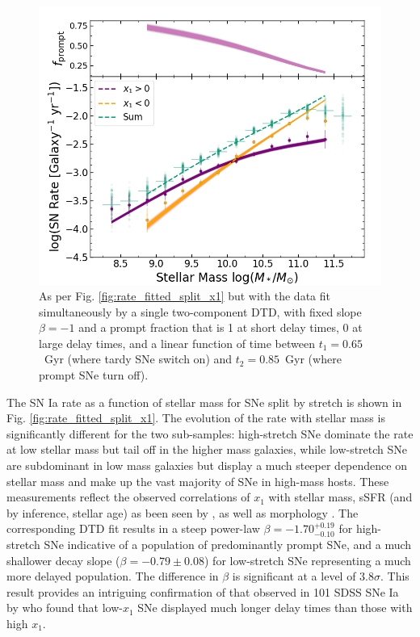\documentclass[fleqn,usenatbib]{mnras}
\begin{document}
\begin{figure}
    \centering
    \includegraphics[width=.5\textwidth]{figs/rate_vs_mass_DTD_fit_beta_norm_Qerf1.1_split_x1_fitjoint.png}
    \caption{As per Fig. \ref{fig:rate_fitted_split_x1} but with the data fit simultaneously by a single two-component DTD, with fixed slope $\beta = -1$ and a prompt fraction that is 1 at short delay times, 0 at large delay times, and a linear function of time between $t_1 =0.65$~Gyr (where tardy SNe switch on) and $t_2=0.85$~Gyr (where prompt SNe turn off).%
    \label{fig:rate_fitted_split_x1_2c_DTD}}
\end{figure}
The SN Ia rate as a function of stellar mass for SNe split by stretch is shown in Fig. \ref{fig:rate_fitted_split_x1}. The evolution of the rate with stellar mass is significantly different for the two sub-samples: high-stretch SNe dominate the rate at low stellar mass but tail off in the higher mass galaxies, while low-stretch SNe are subdominant in low mass galaxies but display a much steeper dependence on stellar mass and make up the vast majority of SNe in high-mass hosts. These measurements reflect the observed correlations of $x_1$ with stellar mass, sSFR (and by inference, stellar age) as been seen by \citet{Rigault2013,Graur2017,Rigault2018,Rose2019,Hakobyan2020,Nicolas2020,Rose2021}, as well as morphology \citep{Hakobyan2020}. The corresponding DTD fit results in a steep power-law $\beta =-1.70^{+0.19}_{-0.10}$ for high-stretch SNe indicative of a population of predominantly prompt SNe, and a much shallower decay slope ($\beta = -0.79 \pm 0.08$) for low-stretch SNe representing a much more delayed population. The difference in $\beta$ is significant at a level of $3.8\sigma$. This result provides an intriguing confirmation of that observed in 101 SDSS SNe Ia by \citet{Brandt2010} who found that low-$x_1$ SNe displayed much longer delay times than those with high $x_1$.
\end{document}
